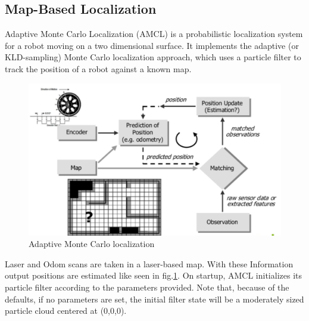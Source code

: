 \subsection{Map-Based Localization\cite{mbl}} %
Adaptive Monte Carlo Localization (AMCL) is a probabilistic localization system for a robot moving on a two dimensional surface. It implements the adaptive (or KLD-sampling) Monte Carlo localization\cite{acml1}\cite{acml2} approach, which uses a particle filter to track the position of a robot against a known map.
\begin{figure}[!htbp]
	\begin{center}
		\includegraphics[width = 15cm]{Pictures/amcl.png}
		\caption[The ListOfFigures caption]{Adaptive Monte Carlo localization \footnotemark[1]}
		\label{amcl}
	\end{center}
\end{figure}
Laser and Odom scans are taken in a laser-based map. With these Information output positions are estimated like seen in fig.\ref{amcl}. On startup, AMCL initializes its particle filter according to the parameters provided. Note that, because of the defaults, if no parameters are set, the initial filter state will be a moderately sized particle cloud centered at (0,0,0).
\\

